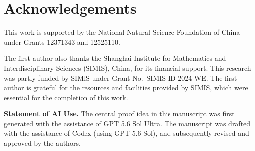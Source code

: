 \documentclass[reqno,12pt]{amsart}
\theoremstyle{definition}
\begin{document}
\section*{Acknowledgements}

This work is supported by the National Natural Science Foundation of China
under Grants 12371343 and 12525110.

The first author also thanks the Shanghai Institute for Mathematics and
Interdisciplinary Sciences (SIMIS), China, for its financial support. This research
was partly funded by SIMIS under Grant No.~SIMIS-ID-2024-WE. The first author is
grateful for the resources and facilities provided by SIMIS, which were essential
for the completion of this work.

\vspace{1em}
{\bfseries Statement of AI Use.} 
The central proof idea in this manuscript was first generated with the assistance of GPT 5.6 Sol Ultra. The manuscript was drafted with the assistance of Codex (using GPT 5.6 Sol), and subsequently revised and approved by the authors.
\end{document}
